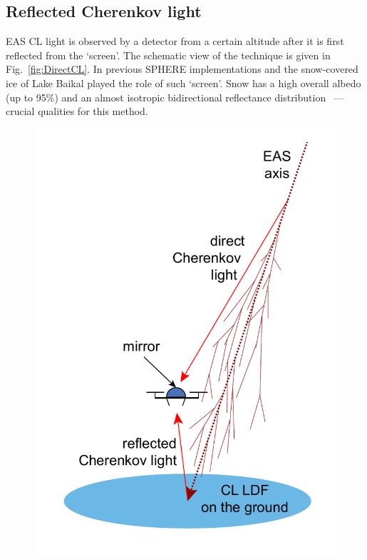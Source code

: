 \documentclass[a4paper,11pt]{article}
\begin{document}
\subsection{Reflected Cherenkov light}

EAS CL light is observed by a detector from a certain altitude after it is first reflected from the `screen'. The schematic view of the technique is given in Fig.~\ref{fig:DirectCL}. In previous SPHERE implementations and the snow-covered ice of Lake Baikal played the role of such `screen'. Snow has a high overall albedo (up to 95\%) and an almost isotropic bidirectional reflectance distribution~\cite{Warren1982} --- crucial qualities for this method.

\begin{figure}
\centering
    \begin{minipage}{.3\textwidth}
        \includegraphics[width=1\textwidth]{DirectCL.pdf}

\end{minipage}
\end{figure}
\end{document}
